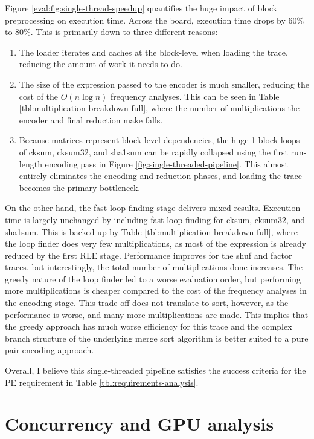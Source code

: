 Figure \ref{eval:fig:single-thread-speedup}
quantifies the huge impact of block preprocessing on execution time. Across the board, execution time drops by 60\% to 
80\%. This is primarily down to three different reasons:
\begin{enumerate}
  \item The loader iterates and caches at the block-level when loading the trace, reducing the amount of work it needs to do.
  \item The size of the expression passed to the encoder is much smaller, reducing the cost of the $O(n\log n)$ frequency 
    analyses. This can be seen in Table \ref{tbl:multiplication-breakdown-full},
    where the number of multiplications the encoder and final reduction make falls.
  \item Because matrices represent block-level dependencies, the huge 1-block loops of cksum, cksum32, and sha1sum can be rapidly 
    collapsed using the first run-length encoding pass in Figure \ref{fig:single-threaded-pipeline}.
    This almost entirely eliminates the encoding and reduction phases, and loading the trace becomes the primary bottleneck.
\end{enumerate}

On the other hand, the fast loop finding stage delivers mixed results. Execution time is largely unchanged by including 
fast loop finding for cksum, cksum32, and sha1sum. This is backed up by Table \ref{tbl:multiplication-breakdown-full},
where the loop finder does very few multiplications, as most of the expression is already reduced by the first RLE stage.
Performance improves for the shuf and factor traces, but interestingly, the total number of multiplications done increases.
The greedy nature of the loop finder led to a worse evaluation order, but performing more 
multiplications is cheaper compared to the cost of the frequency analyses in the encoding stage.
This trade-off does not translate to sort, however, as the performance is worse, and many more multiplications 
are made. This implies that the greedy approach has much worse efficiency for this trace and the complex 
branch structure of the underlying merge sort algorithm is better suited to a pure pair encoding approach.

Overall, I believe this single-threaded pipeline satisfies the success criteria for the PE requirement in Table
\ref{tbl:requirements-analysis}.

\section{Concurrency and GPU analysis}

